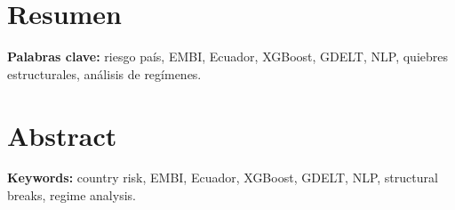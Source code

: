 \chapter*{Resumen}


\vspace{1cm}

\noindent \textbf{Palabras clave:} riesgo país, EMBI, Ecuador, XGBoost, GDELT, NLP, quiebres estructurales, análisis de regímenes.

\vspace{1cm}

\chapter*{Abstract}


\vspace{1cm}

\noindent \textbf{Keywords:} country risk, EMBI, Ecuador, XGBoost, GDELT, NLP, structural breaks, regime analysis.
